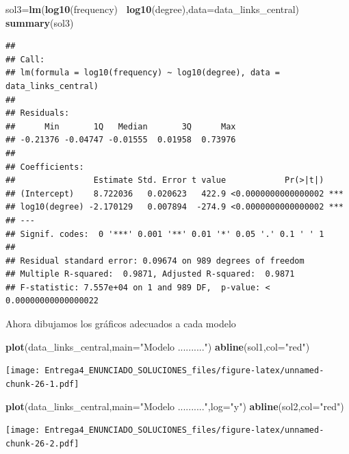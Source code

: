 \documentclass[
]{article}
\newenvironment{Shaded}{\begin{snugshade}}{\end{snugshade}}
\newcommand{\DataTypeTok}[1]{\textcolor[rgb]{0.13,0.29,0.53}{#1}}
\newcommand{\KeywordTok}[1]{\textcolor[rgb]{0.13,0.29,0.53}{\textbf{#1}}}
\newcommand{\NormalTok}[1]{#1}
\newcommand{\OperatorTok}[1]{\textcolor[rgb]{0.81,0.36,0.00}{\textbf{#1}}}
\newcommand{\StringTok}[1]{\textcolor[rgb]{0.31,0.60,0.02}{#1}}
\begin{document}
\begin{Shaded}
\begin{Highlighting}[]
\NormalTok{sol3=}\KeywordTok{lm}\NormalTok{(}\KeywordTok{log10}\NormalTok{(frequency)}\OperatorTok{~}\StringTok{ }\KeywordTok{log10}\NormalTok{(degree),}\DataTypeTok{data=}\NormalTok{data_links_central)}
\KeywordTok{summary}\NormalTok{(sol3)}
\end{Highlighting}
\end{Shaded}

\begin{verbatim}
## 
## Call:
## lm(formula = log10(frequency) ~ log10(degree), data = data_links_central)
## 
## Residuals:
##      Min       1Q   Median       3Q      Max 
## -0.21376 -0.04747 -0.01555  0.01958  0.73976 
## 
## Coefficients:
##                Estimate Std. Error t value            Pr(>|t|)    
## (Intercept)    8.722036   0.020623   422.9 <0.0000000000000002 ***
## log10(degree) -2.170129   0.007894  -274.9 <0.0000000000000002 ***
## ---
## Signif. codes:  0 '***' 0.001 '**' 0.01 '*' 0.05 '.' 0.1 ' ' 1
## 
## Residual standard error: 0.09674 on 989 degrees of freedom
## Multiple R-squared:  0.9871, Adjusted R-squared:  0.9871 
## F-statistic: 7.557e+04 on 1 and 989 DF,  p-value: < 0.00000000000000022
\end{verbatim}

Ahora dibujamos los gráficos adecuados a cada modelo

\begin{Shaded}
\begin{Highlighting}[]
\KeywordTok{plot}\NormalTok{(data_links_central,}\DataTypeTok{main=}\StringTok{"Modelo .........."}\NormalTok{)}
\KeywordTok{abline}\NormalTok{(sol1,}\DataTypeTok{col=}\StringTok{"red"}\NormalTok{)}
\end{Highlighting}
\end{Shaded}

\texttt{[image: Entrega4\_ENUNCIADO\_SOLUCIONES\_files/figure-latex/unnamed-chunk-26-1.pdf]}

\begin{Shaded}
\begin{Highlighting}[]
\KeywordTok{plot}\NormalTok{(data_links_central,}\DataTypeTok{main=}\StringTok{"Modelo .........."}\NormalTok{,}\DataTypeTok{log=}\StringTok{"y"}\NormalTok{)}
\KeywordTok{abline}\NormalTok{(sol2,}\DataTypeTok{col=}\StringTok{"red"}\NormalTok{)}
\end{Highlighting}
\end{Shaded}

\texttt{[image: Entrega4\_ENUNCIADO\_SOLUCIONES\_files/figure-latex/unnamed-chunk-26-2.pdf]}
\end{document}
